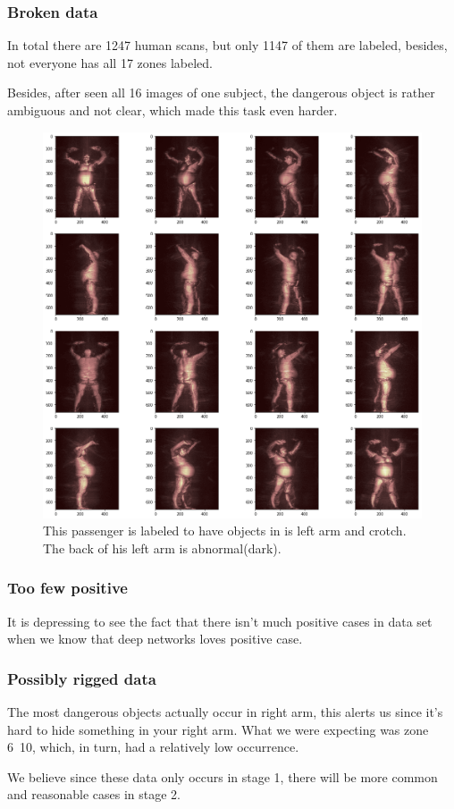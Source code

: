 \documentclass[conference,compsoc]{IEEEtran}
\begin{document}
	\subsubsection{Broken data} In total there are 1247 human scans, but only 1147 of them are labeled, besides, not everyone has all 17 zones labeled. 
	\par Besides, after seen all 16 images of one subject, the dangerous object is rather ambiguous and not clear, which made this task even harder.
	\begin{figure}[h] \label{ffefec}
		\centering
		\includegraphics[width=0.9\linewidth]{../Pic/ffefec0cd4e1e2c3fe64bb93f082efdd}
		\caption{This passenger is labeled to have objects in is left arm and crotch. The back of his left arm is abnormal(dark).}
	\end{figure}
	\subsubsection{Too few positive} It is depressing to see the fact that there isn't much positive cases in data set when we know that deep networks loves positive case.	
	\subsubsection{Possibly rigged data} The most dangerous objects actually occur in right arm, this alerts us since it's hard to hide something in your right arm. What we were expecting was zone 6~10, which, in turn, had a relatively low occurrence.  
	\par We believe since these data only occurs in stage 1, there will be more common and reasonable cases in stage 2.
\end{document}
